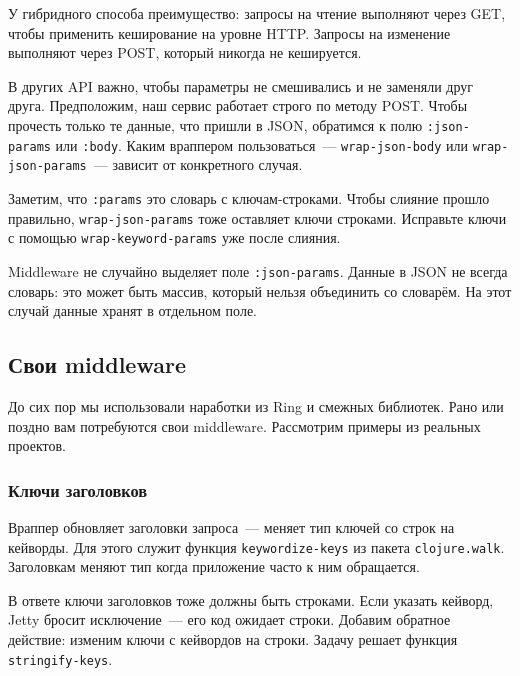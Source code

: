 У гибридного способа преимущество: запросы на чтение выполняют через GET, чтобы
применить кеширование на уровне HTTP. Запросы на изменение выполняют через POST,
который никогда не кешируется.

В других API важно, чтобы параметры не смешивались и не заменяли друг
друга. Предположим, наш сервис работает строго по методу POST. Чтобы прочесть
только те данные, что пришли в JSON, обратимся к полю \verb|:json-params| или
\verb|:body|. Каким враппером пользоваться~--- \verb|wrap-json-body| или
\verb|wrap-json-params|~--- зависит от конкретного случая.


Заметим, что \verb|:params| это словарь с ключам-строками. Чтобы слияние
прошло правильно, \verb|wrap-json-params| тоже оставляет ключи
строками. Исправьте ключи с помощью \verb|wrap-keyword-params| уже после
слияния.

Middleware не случайно выделяет поле \verb|:json-params|. Данные в JSON не
всегда словарь: это может быть массив, который нельзя объединить со
словарём. На этот случай данные хранят в отдельном поле.

\subsection{Свои middleware}


До сих пор мы использовали наработки из Ring и смежных библиотек. Рано или
поздно вам потребуются свои middleware. Рассмотрим примеры из реальных проектов.

\subsubsection*{Ключи заголовков}


Враппер обновляет заголовки запроса~--- меняет тип ключей со строк на
кейворды. Для этого служит функция \verb|keywordize-keys| из пакета
\verb|clojure.walk|. Заголовкам меняют тип когда приложение часто к ним
обращается.


В ответе ключи заголовков тоже должны быть строками. Если указать кейворд, Jetty
бросит исключение~--- его код ожидает строки. Добавим обратное действие: изменим
ключи с кейвордов на строки. Задачу решает функция \verb|stringify-keys|.

